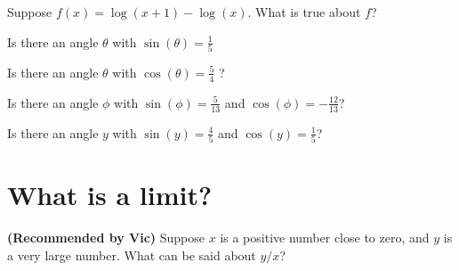 \documentclass{ximera}
\newcommand{\recommendation}[1]{\textbf{(Recommended by #1)}}
\begin{document}
\begin{problem}
	Suppose $f(x) = \log(x+1) - \log(x)$.  What is true about $f$?
	\begin{multipleChoice}
  \end{multipleChoice}
\end{problem}

\begin{problem}
	Is there an angle $\theta$ with $\sin(\theta) = \frac{1}{5}$ %
	\begin{multipleChoice}
	\end{multipleChoice}
\end{problem}

\begin{problem}
	Is there an angle $\theta$ with $\cos(\theta) = \frac{5}{4}$ ?
	\begin{multipleChoice}
		\choice{Yes}
		\choice[correct]{No}
	\end{multipleChoice}
\end{problem}

\begin{problem}
	Is there an angle $\phi$ with $\sin(\phi) = \frac{5}{13}$ and $\cos(\phi) = -\frac{12}{13}$?
	\begin{multipleChoice}
		\choice[correct]{Yes}
		\choice{No}
	\end{multipleChoice}
\end{problem}

\begin{problem}
	Is there an angle $y$ with $\sin(y) = \frac{4}{5}$ and $\cos(y) = \frac{1}{5}$?
	\begin{multipleChoice}
	\end{multipleChoice}
\end{problem}

\clearpage

\section{What is a limit?}

\begin{problem}
\recommendation{Vic}
  Suppose $x$ is a positive number close to zero, and $y$ is a very large number.  What can be said about $y/x$?
  \begin{multipleChoice}
  \end{multipleChoice}
\end{problem}
\end{document}
